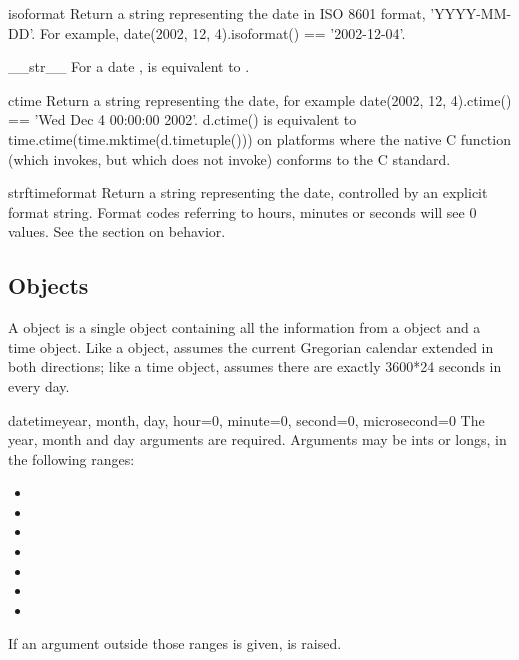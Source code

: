 \begin{methoddesc}{isoformat}{}
    Return a string representing the date in ISO 8601 format,
    'YYYY-MM-DD'.  For example,
    date(2002, 12, 4).isoformat() == '2002-12-04'.
\end{methoddesc}
\begin{methoddesc}{__str__}{}
    For a date ,  is equivalent to
    .
\end{methoddesc}
\begin{methoddesc}{ctime}{}
    Return a string representing the date, for example
    date(2002, 12, 4).ctime() == 'Wed Dec  4 00:00:00 2002'.
    d.ctime() is equivalent to time.ctime(time.mktime(d.timetuple()))
    on platforms where the native C  function
    (which  invokes, but which
     does not invoke) conforms to the C standard.
\end{methoddesc}
\begin{methoddesc}{strftime}{format}
    Return a string representing the date, controlled by an explicit
    format string.  Format codes referring to hours, minutes or seconds
    will see 0 values.
    See the section on  behavior.
\end{methoddesc}


\subsection{ Objects \label{datetime-datetime}}

A  object is a single object containing all the
information from a  object and a time object.  Like a
 object,  assumes the current Gregorian
calendar extended in both directions; like a time object,
 assumes there are exactly 3600*24 seconds in every
day.

\begin{funcdesc}datetime{year, month, day,
             hour=0, minute=0, second=0, microsecond=0}
The year, month and day arguments are required.  Arguments may be ints
or longs, in the following ranges:

\begin{itemize}
  \item {}
  \item {}
  \item {}
  \item {}
  \item {}
  \item {}
  \item {}
\end{itemize}

If an argument outside those ranges is given,
 is raised.
\end{funcdesc}

